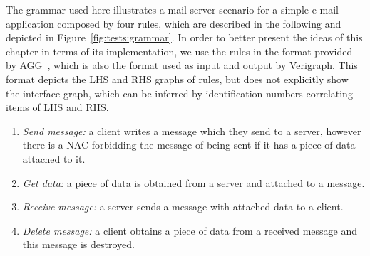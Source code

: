 
\begin{example} %
  The grammar used here illustrates a mail server scenario for a simple e-mail application composed by four rules, which are described in the following and depicted in Figure~\ref{fig:tests:grammar}.
  In order to better present the ideas of this chapter in terms of its implementation, we use the rules in the format provided by AGG~\cite{Taentzer2000}, which is also the format used as input and output by Verigraph.
  This format depicts the LHS and RHS graphs of rules, but does not explicitly show the interface graph, which can be inferred by identification numbers correlating items of LHS and RHS.

\begin{enumerate}[label=(\alph*),start=1]
  \item \emph{Send message:} a client writes a message which they send to a server, however there is a NAC forbidding the message of being sent if it has a piece of data attached to it.
  \item \emph{Get data:} a piece of data is obtained from a server and attached to a message.
  \item \emph{Receive message:} a server sends a message with attached data to a client.
  \item \emph{Delete message:} a client obtains a piece of data from a received message and this message is destroyed.
\end{enumerate}
\end{example}
%

